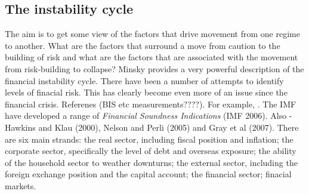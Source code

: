 \documentclass[12pt, a4paper, oneside]{article} %
\begin{document}
\subsection{The instability cycle}
The aim is to get some view of the factors that drive movement from one regime to another.  What are the factors that surround a move from caution to the building of risk and what are the factors that are associated with the movement from risk-building to collapse?  Minsky provides a very powerful description of the financial instability cycle.   There have been a number of attempts to identify levels of finacial risk.  This has clearly become even more of an issue since the financial crisis. Referenes (BIS etc measurements????).  For example, \citet{IFCMeasure}.  The IMF have developed a range of \emph{Financial Soundness Indications} (IMF 2006).     Also - Hawkins and Klau (2000), Nelson and Perli (2005) and Gray et al (2007).  There are six main strands:  the real sector, including fiscal position and inflation; the corporate sector, specifically the level of debt and overseas exposure; the ability of the household sector to weather downturns; the external sector, including the foreign exchange position and the capital account; the financial sector; finacial markets. 

\end{document}
